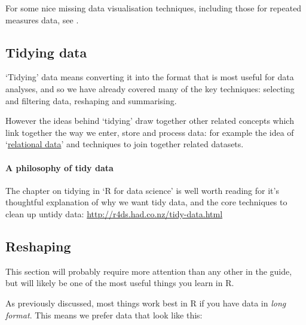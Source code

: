 \documentclass[]{article}
\let\oldparagraph\paragraph
\renewcommand{\paragraph}[1]{\oldparagraph{#1}\mbox{}}
\begin{document}
For some nice missing data visualisation techniques, including those for repeated measures data, see \citet{zhang2015missing}.

\hypertarget{tidyingdata}{%
\subsection*{Tidying data}\label{tidyingdata}}

`Tidying' data means converting it into the format that is most useful for data
analyses, and so we have already covered many of the key techniques: selecting
and filtering data, reshaping and summarising.

However the ideas behind `tidying' draw together other related concepts which
link together the way we enter, store and process data: for example the idea of
`\href{}{relational data}' and techniques to join together related datasets.

\hypertarget{a-philosophy-of-tidy-data}{%
\paragraph{A philosophy of tidy data}\label{a-philosophy-of-tidy-data}}

The chapter on tidying in `R for data science' is well worth reading for it's
thoughtful explanation of why we want tidy data, and the core techniques to
clean up untidy data: \url{http://r4ds.had.co.nz/tidy-data.html}

\hypertarget{reshaping}{%
\subsection*{Reshaping}\label{reshaping}}

This section will probably require more attention than any other in the guide,
but will likely be one of the most useful things you learn in R.

As previously discussed, most things work best in R if you have data in \emph{long
format}. This means we prefer data that look like this:
\end{document}
